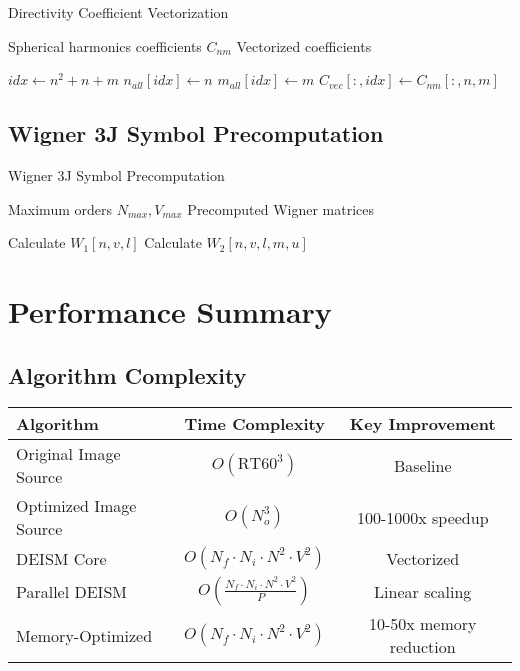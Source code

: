 \documentclass[11pt,a4paper]{article}
\begin{document}
\begin{algorithm}[H]
\caption{Directivity Coefficient Vectorization}
\begin{algorithmic}[1]
\Require Spherical harmonics coefficients $C_{nm}$
\Ensure Vectorized coefficients

        \State $idx \leftarrow n^2 + n + m$
        \State $n_{all}[idx] \leftarrow n$
        \State $m_{all}[idx] \leftarrow m$
        \State $C_{vec}[:, idx] \leftarrow C_{nm}[:, n, m]$
    \EndFor
\EndFor
\end{algorithmic}
\end{algorithm}

\subsection{Wigner 3J Symbol Precomputation}

\begin{algorithm}[H]
\caption{Wigner 3J Symbol Precomputation}
\begin{algorithmic}[1]
\Require Maximum orders $N_{max}, V_{max}$
\Ensure Precomputed Wigner matrices

            \State Calculate $W_1[n,v,l]$
                        \State Calculate $W_2[n,v,l,m,u]$
                    \EndIf
                \EndFor
            \EndFor
        \EndFor
    \EndFor
\EndFor
\end{algorithmic}
\end{algorithm}

\section{Performance Summary}

\subsection{Algorithm Complexity}

\begin{center}
\begin{tabular}{|l|c|c|}
\hline
\textbf{Algorithm} & \textbf{Time Complexity} & \textbf{Key Improvement} \\
\hline
Original Image Source & $O(\text{RT60}^3)$ & Baseline \\
Optimized Image Source & $O(N_o^3)$ & 100-1000x speedup \\
DEISM Core & $O(N_f \cdot N_i \cdot N^2 \cdot V^2)$ & Vectorized \\
Parallel DEISM & $O(\frac{N_f \cdot N_i \cdot N^2 \cdot V^2}{P})$ & Linear scaling \\
Memory-Optimized & $O(N_f \cdot N_i \cdot N^2 \cdot V^2)$ & 10-50x memory reduction \\
\hline
\end{tabular}
\end{center}
\end{document}
